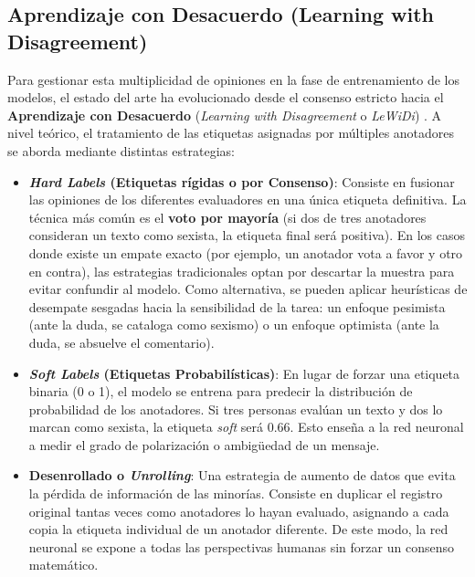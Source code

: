\subsection{Aprendizaje con Desacuerdo (Learning with Disagreement)}
\label{subsec:LWD}
Para gestionar esta multiplicidad de opiniones en la fase de entrenamiento de los modelos, el estado del arte ha evolucionado desde el consenso estricto hacia el \textbf{Aprendizaje con Desacuerdo} (\textit{Learning with Disagreement} o \textit{LeWiDi}) \cite{plank2022problem}. A nivel teórico, el tratamiento de las etiquetas asignadas por múltiples anotadores se aborda mediante distintas estrategias:
\begin{itemize}
    \item \textbf{\textit{Hard Labels} (Etiquetas rígidas o por Consenso)}: Consiste en fusionar las opiniones de los diferentes evaluadores en una única etiqueta definitiva. La técnica más común es el \textbf{voto por mayoría} (si dos de tres anotadores consideran un texto como sexista, la etiqueta final será positiva). En los casos donde existe un empate exacto (por ejemplo, un anotador vota a favor y otro en contra), las estrategias tradicionales optan por descartar la muestra para evitar confundir al modelo. Como alternativa, se pueden aplicar heurísticas de desempate sesgadas hacia la sensibilidad de la tarea: un enfoque pesimista (ante la duda, se cataloga como sexismo) o un enfoque optimista (ante la duda, se absuelve el comentario). 
    \item \textbf{\textit{Soft Labels} (Etiquetas Probabilísticas)}: En lugar de forzar una etiqueta binaria (0 o 1), el modelo se entrena para predecir la distribución de probabilidad de los anotadores. Si tres personas evalúan un texto y dos lo marcan como sexista, la etiqueta \textit{soft} será 0.66. Esto enseña a la red neuronal a medir el grado de polarización o ambigüedad de un mensaje. 
    \item \textbf{Desenrollado o \textit{Unrolling}}: Una estrategia de aumento de datos que evita la pérdida de información de las minorías. Consiste en duplicar el registro original tantas veces como anotadores lo hayan evaluado, asignando a cada copia la etiqueta individual de un anotador diferente. De este modo, la red neuronal se expone a todas las perspectivas humanas sin forzar un consenso matemático. 
\end{itemize}

